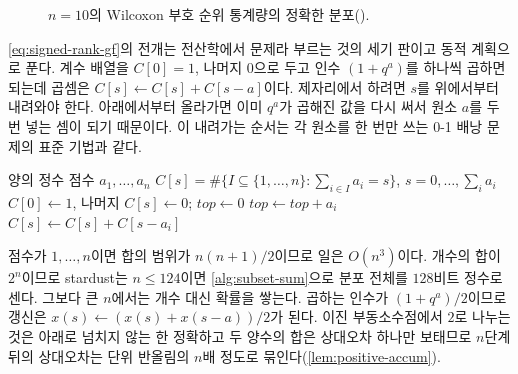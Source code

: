 \begin{figure}[htbp]
\centering
{}
\caption{$n=10$의 Wilcoxon 부호 순위 통계량의 정확한 분포().}
\label{fig:signed-dist}
\end{figure}

\cref{eq:signed-rank-gf}의 전개는 전산학에서  문제라 부르는 것의 세기 판이고 동적 계획으로 푼다. 계수 배열을 $C[0]=1$, 나머지 $0$으로 두고 인수 $(1+q^a)$를 하나씩 곱하면 되는데 곱셈은 $C[s]\gets C[s]+C[s-a]$이다. 제자리에서 하려면 $s$를 위에서부터 내려와야 한다. 아래에서부터 올라가면 이미 $q^a$가 곱해진 값을 다시 써서 원소 $a$를 두 번 넣는 셈이 되기 때문이다. 이 내려가는 순서는 각 원소를 한 번만 쓰는 0-1 배낭 문제의 표준 기법과 같다.

\begin{algorithm}[htbp]
\begin{algorithmic}[1]
\Require 양의 정수 점수 $a_1,\dots,a_n$
\Ensure $C[s]=\#\{I\subseteq\{1,\dots,n\}:\sum_{i\in I}a_i=s\}$, $s=0,\dots,\sum_ia_i$
\State $C[0]\gets1$, 나머지 $C[s]\gets0$; $\mathit{top}\gets0$
  \State $\mathit{top}\gets\mathit{top}+a_i$
   
    \State $C[s]\gets C[s]+C[s-a_i]$
  \EndFor
\EndFor
\end{algorithmic}
\caption{부분집합 합의 개수 (stardust 의 )}
\label{alg:subset-sum}
\end{algorithm}

점수가 $1,\dots,n$이면 합의 범위가 $n(n+1)/2$이므로 일은 $O(n^3)$이다. 개수의 합이 $2^n$이므로 stardust는 $n\le124$이면 \cref{alg:subset-sum}으로 분포 전체를 $128$비트 정수로 센다. 그보다 큰 $n$에서는 개수 대신 확률을 쌓는다. 곱하는 인수가 $(1+q^a)/2$이므로 갱신은 $x(s)\gets(x(s)+x(s-a))/2$가 된다. 이진 부동소수점에서 $2$로 나누는 것은 아래로 넘치지 않는 한 정확하고 두 양수의 합은 상대오차 하나만 보태므로 $n$단계 뒤의 상대오차는 단위 반올림의 $n$배 정도로 묶인다(\cref{lem:positive-accum}).


